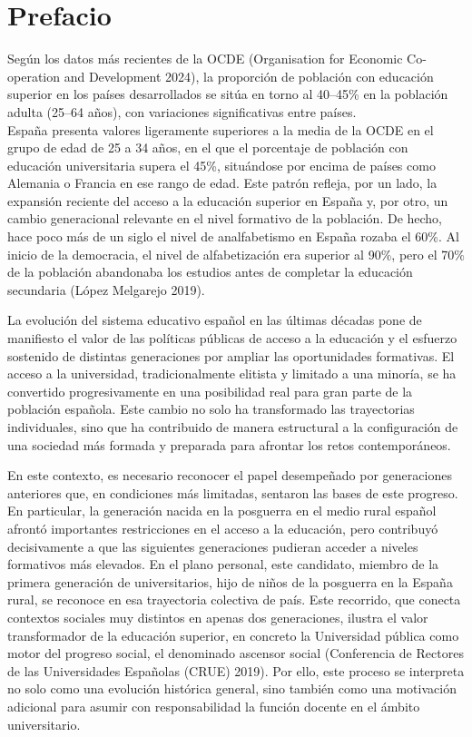 \documentclass[
  11pt,
  a4paper,
  twoside]{scrreprt}
\begin{document}
\newpage


\chapter{Prefacio}\label{prefacio}

Según los datos más recientes de la OCDE (Organisation for Economic
Co-operation and Development 2024), la proporción de población con
educación superior en los países desarrollados se sitúa en torno al
40--45\% en la población adulta (25--64 años), con variaciones
significativas entre países.\\
España presenta valores ligeramente superiores a la media de la OCDE en
el grupo de edad de 25 a 34 años, en el que el porcentaje de población
con educación universitaria supera el 45\%, situándose por encima de
países como Alemania o Francia en ese rango de edad. Este patrón
refleja, por un lado, la expansión reciente del acceso a la educación
superior en España y, por otro, un cambio generacional relevante en el
nivel formativo de la población. De hecho, hace poco más de un siglo el
nivel de analfabetismo en España rozaba el 60\%. Al inicio de la
democracia, el nivel de alfabetización era superior al 90\%, pero el
70\% de la población abandonaba los estudios antes de completar la
educación secundaria (López Melgarejo 2019).

La evolución del sistema educativo español en las últimas décadas pone
de manifiesto el valor de las políticas públicas de acceso a la
educación y el esfuerzo sostenido de distintas generaciones por ampliar
las oportunidades formativas. El acceso a la universidad,
tradicionalmente elitista y limitado a una minoría, se ha convertido
progresivamente en una posibilidad real para gran parte de la población
española. Este cambio no solo ha transformado las trayectorias
individuales, sino que ha contribuido de manera estructural a la
configuración de una sociedad más formada y preparada para afrontar los
retos contemporáneos.

En este contexto, es necesario reconocer el papel desempeñado por
generaciones anteriores que, en condiciones más limitadas, sentaron las
bases de este progreso. En particular, la generación nacida en la
posguerra en el medio rural español afrontó importantes restricciones en
el acceso a la educación, pero contribuyó decisivamente a que las
siguientes generaciones pudieran acceder a niveles formativos más
elevados. En el plano personal, este candidato, miembro de la primera
generación de universitarios, hijo de niños de la posguerra en la España
rural, se reconoce en esa trayectoria colectiva de país. Este recorrido,
que conecta contextos sociales muy distintos en apenas dos generaciones,
ilustra el valor transformador de la educación superior, en concreto la
Universidad pública como motor del progreso social, el denominado
ascensor social (Conferencia de Rectores de las Universidades Españolas
(CRUE) 2019). Por ello, este proceso se interpreta no solo como una
evolución histórica general, sino también como una motivación adicional
para asumir con responsabilidad la función docente en el ámbito
universitario.
\end{document}

